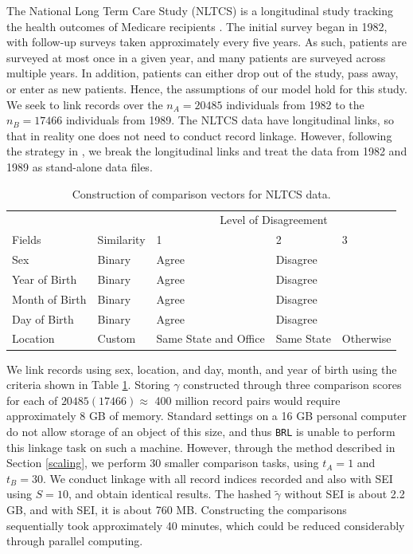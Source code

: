 \documentclass[ba]{imsart}
\begin{document}
	
	The National Long Term Care Study (NLTCS) is a longitudinal study tracking the health outcomes of Medicare recipients \citep{steorts_bayesian_2016}. The initial survey began in 1982, with follow-up surveys taken approximately every five years. As such, patients are surveyed at most once in a given year, and many patients are surveyed across multiple years. In addition, patients can either drop out of the study, pass away, or enter as new patients. Hence, the assumptions of our model hold for this study. We seek to link records over the $n_A = 20485$ individuals from 1982 to the $n_B = 17466$ individuals from 1989. The NLTCS data have longitudinal links, so that in reality one does not need to conduct record linkage. However, following the strategy in \cite{guha:reiter:BA}, we break the longitudinal links and treat the data from 1982 and 1989 as stand-alone data files.
	
	\begin{table}
		\centering
		\begin{tabular}[t]{lllll}
			\multicolumn{2}{c}{ } & \multicolumn{3}{c}{Level of Disagreement} \\
			\cline{3-5}
			Fields & Similarity & 1 & 2 & 3\\
			\hline
			Sex & Binary & Agree & Disagree & \\
			Year of Birth & Binary & Agree & Disagree & \\
			Month of Birth & Binary & Agree & Disagree & \\
			Day of Birth & Binary & Agree & Disagree & \\
			Location & Custom & Same State and Office & Same State & Otherwise \\
			\hline
		\end{tabular}
		\caption{Construction of comparison vectors for NLTCS data.}\label{Tab:nltcs-comparisons}
	\end{table}
	
	We link records using sex, location, and day, month, and year of birth using the criteria shown in Table \ref{Tab:nltcs-comparisons}. Storing $\gamma$ constructed through three comparison scores for each of $20485 (17466) \approx$ 400 million record pairs would require approximately 8 GB of memory. Standard settings on a 16 GB personal computer do not allow storage of an object of this size, and thus \texttt{BRL} is unable to perform this linkage task on such a machine. However, through the method described in Section \ref{scaling},  we perform 30 smaller comparison tasks, using $t_A = 1$ and $t_B = 30$. We conduct linkage with all record indices recorded and also with SEI using $S=10$, and obtain identical results. The hashed $\tilde{\gamma}$ without SEI is about 2.2 GB, and with SEI, it is about 760 MB. Constructing the comparisons sequentially took approximately 40 minutes, which could be reduced considerably through parallel computing.
	
\end{document}

